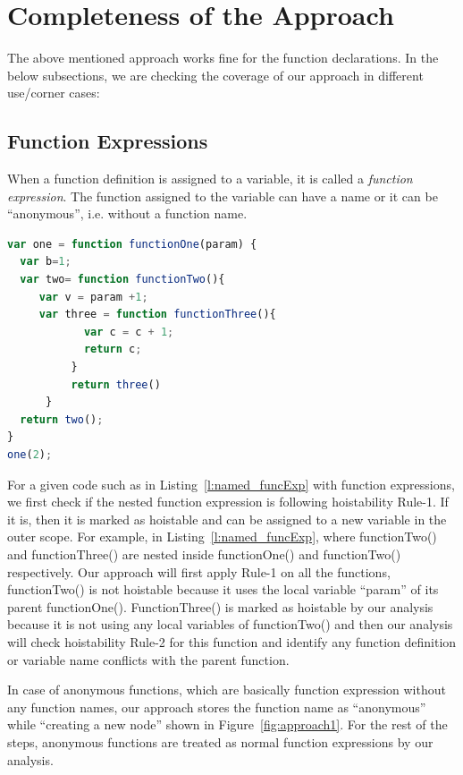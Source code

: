 \documentclass[authoryear,preprint]{sigplanconf}
\begin{document}
\section{Completeness of the Approach}
\label{sec:completeness}
The above mentioned approach works fine for the function declarations. In the below subsections, we are checking the coverage of our approach in different use/corner cases:

\subsection{Function Expressions}
When a function definition is assigned to a variable, it is called a \textit{function expression}. The function assigned to the variable can have a name or it can be \enquote{anonymous}, i.e. without a function name. \par

\lstset{numbers=left, numberstyle=\tiny, stepnumber=1, numbersep=5pt}
\lstset{basicstyle=\ttfamily}
\lstset{frame=tb, frame=bottomline}

\begin{lstlisting}[float,caption=Function Expression ,label=l:named_funcExp,language=JavaScript]
var one = function functionOne(param) {
  var b=1;
  var two= function functionTwo(){
     var v = param +1;
     var three = function functionThree(){
            var c = c + 1;
            return c;
          }
          return three()
      }
  return two();
}
one(2);
\end{lstlisting} 

For a given code such as in Listing~\ref{l:named_funcExp} with function expressions, we first check if the nested function expression is following hoistability Rule-1. If it is, then it is marked as hoistable and can be assigned to a new variable in the outer scope. For example, in Listing~\ref{l:named_funcExp}, where functionTwo() and functionThree() are nested inside functionOne() and  functionTwo() respectively. Our approach will first apply Rule-1 on all the functions, functionTwo() is not hoistable because it uses the local variable \enquote{param} of its parent functionOne(). FunctionThree() is marked as hoistable by our analysis because it is not using any local variables of functionTwo() and then our analysis will check hoistability Rule-2 for this function and identify any function definition or variable name conflicts with the parent function. 

In case of anonymous functions, which are basically function expression without any function names, our approach stores the function name as \enquote{anonymous} while \enquote{creating a new node} shown in Figure~\ref{fig:approach1}. For the rest of the steps, anonymous functions are treated as normal function expressions by our analysis.
\end{document}
